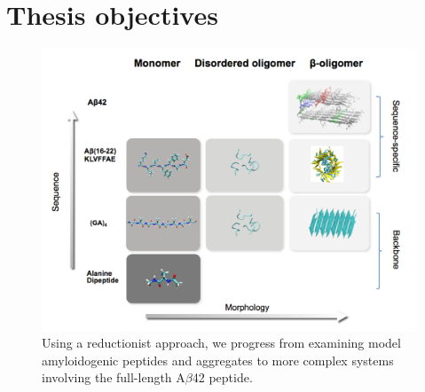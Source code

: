 



\section{Thesis objectives}

\begin{figure}
\centering
\includegraphics[width=6in]{figures/introduction/matrix.pdf}
\caption[Thesis Rationale]{Using a reductionist approach, we progress from examining model amyloidogenic peptides and aggregates to more complex systems involving the full-length A$\beta$42 peptide.}
\label{fig:rationale}
\end{figure}

